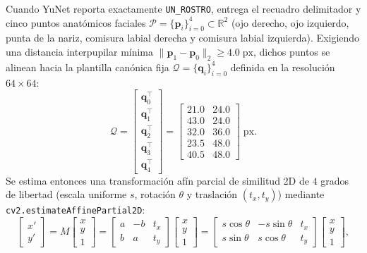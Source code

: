 \documentclass{article}
\begin{document}
Cuando YuNet reporta exactamente \texttt{UN\_ROSTRO}, entrega el recuadro delimitador y cinco puntos anatómicos faciales $\mathcal{P} = \{\mathbf{p}_i\}_{i=0}^4 \subset \mathbb{R}^2$ (ojo derecho, ojo izquierdo, punta de la nariz, comisura labial derecha y comisura labial izquierda). Exigiendo una distancia interpupilar mínima $\|\mathbf{p}_1 - \mathbf{p}_0\|_2 \ge 4.0\;\text{px}$, dichos puntos se alinean hacia la plantilla canónica fija $\mathcal{Q} = \{\mathbf{q}_i\}_{i=0}^4$ definida en la resolución $64 \times 64$:
\begin{equation}
\mathcal{Q} = \begin{bmatrix} \mathbf{q}_0^\top \\ \mathbf{q}_1^\top \\ \mathbf{q}_2^\top \\ \mathbf{q}_3^\top \\ \mathbf{q}_4^\top \end{bmatrix}
= \begin{bmatrix}
21.0 & 24.0 \\
43.0 & 24.0 \\
32.0 & 36.0 \\
23.5 & 48.0 \\
40.5 & 48.0
\end{bmatrix}\;\text{px}.
\label{eq:plantilla_canonica}
\end{equation}
Se estima entonces una transformación afín parcial de similitud 2D de $4$ grados de libertad (escala uniforme $s$, rotación $\theta$ y traslación $(t_x, t_y)$) mediante \texttt{cv2.estimateAffinePartial2D}:
\begin{equation}
\begin{bmatrix} x' \\ y' \end{bmatrix}
= M \begin{bmatrix} x \\ y \\ 1 \end{bmatrix}
= \begin{bmatrix} a & -b & t_x \\ b & a & t_y \end{bmatrix} \begin{bmatrix} x \\ y \\ 1 \end{bmatrix}
= \begin{bmatrix} s\cos\theta & -s\sin\theta & t_x \\ s\sin\theta & s\cos\theta & t_y \end{bmatrix} \begin{bmatrix} x \\ y \\ 1 \end{bmatrix},
\label{eq:similitud_2d}
\end{equation}
\end{document}
